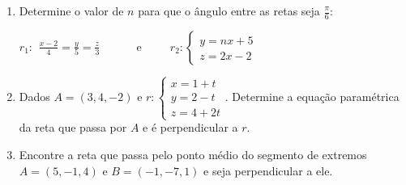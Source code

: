 \documentclass[a4paper,5pt]{amsbook}
\newcommand{\ds}{\displaystyle}
\begin{document}
\begin{enumerate}
	\vspace{0.3cm}
	\item Determine o valor de $n$ para que o \^angulo entre as retas seja
		$\frac{\pi}{6}$:

	$r_1:\begin{array}{l}
		\ds\frac{x-2}{4} = \frac{y}{5} = \frac{z}{3}
	\end{array}$
	\ \ \ \ \ e\ \ \ \ \ 
	$r_2:\left\{\begin{array}{l}
		y = nx + 5 \\
		z = 2x - 2
	\end{array}\right.$
	
	\vspace{0.3cm}
	\item Dados $A = (3, 4, -2)$ e 
	$r:\left\{\begin{array}{l}
		x = 1 + t \\
		y = 2 - t \\
		z = 4 + 2t
	\end{array}\right.$. Determine a equa\c{c}\~ao param\'etrica da reta que passa por
$A$ e \'e perpendicular a $r$.
	
	\vspace{0.3cm}
	\item Encontre a reta que passa pelo ponto m\'edio do segmento de extremos $A
		= (5, -1, 4)$ e $B = (-1, -7, 1)$ e seja perpendicular a ele.
\end{enumerate}
\end{document}
